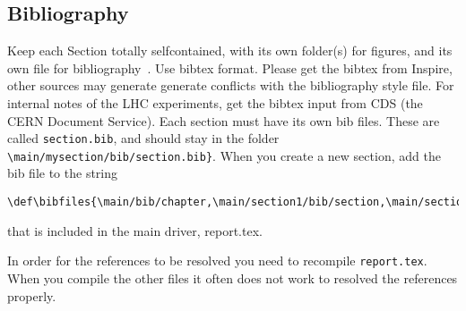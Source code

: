 \subsection{Bibliography}
Keep each Section totally selfcontained, with
its own folder(s) for figures, and its own file for
bibliography~\cite{Mangano:2270978}.
Use bibtex format. Please get the bibtex from Inspire, other sources
may generate generate conflicts with the bibliography style file. For
internal notes of the LHC experiments, get the bibtex input from CDS
(the CERN Document Service). Each section must have its own bib
files. These are called \texttt{section.bib}, and should stay in the
folder
\verb|\main/mysection/bib/section.bib}|.
When you create a new section, add the bib file to the string
\begin{verbatim} 
\def\bibfiles{\main/bib/chapter,\main/section1/bib/section,\main/section2/bib/section}
\end{verbatim}
that is included in the main driver, report.tex.

In order for the references to be resolved you need to recompile \texttt{report.tex}. When you compile the other files it often does not work to resolved the references properly.





